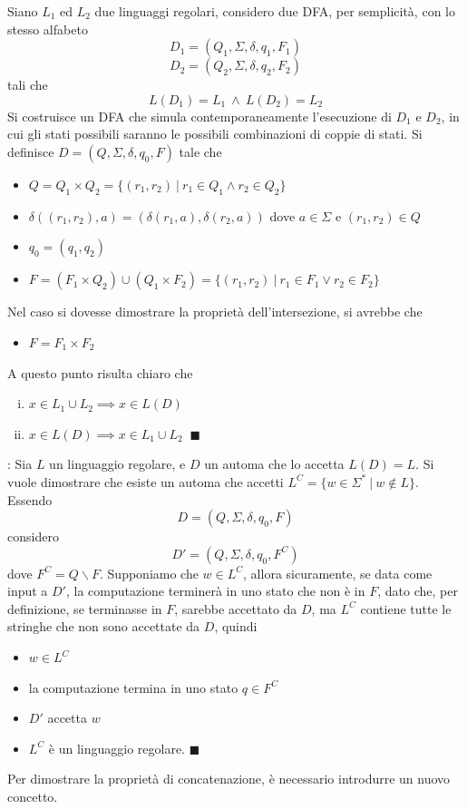 \documentclass[10pt, letterpaper]{report}
\begin{document}
 Siano $L_1$ ed $L_2$ due linguaggi regolari, considero due DFA, per semplicità, con lo stesso alfabeto
$$ 
D_1 = (Q_1,\Sigma,\delta,q_1,F_1)
$$
$$ 
D_2 = (Q_2,\Sigma,\delta,q_2,F_2)
$$
tali che 
$$ L(D_1)=L_1 \ \land \ L(D_2)=L_2$$
Si costruisce un DFA che simula contemporaneamente l'esecuzione di $D_1$ e $D_2$, in cui gli stati possibili saranno 
le possibili combinazioni di coppie di stati. Si definisce $D=(Q,\Sigma,\delta,q_0,F)$ tale che 
\begin{itemize}
    \item $Q=Q_1\times Q_2=\{(r_1,r_2) \ | \ r_1\in Q_1 \land r_2\in Q_2\}$
    \item $\delta((r_1,r_2),a)=(\delta(r_1,a),\delta(r_2,a))$ dove $a\in\Sigma$ e $(r_1,r_2)\in Q$
    \item $q_0=(q_1,q_2)$
    \item $F=(F_1\times Q_2)\cup (Q_1\times F_2)=\{(r_1,r_2)\ | \ r_1\in F_1\lor r_2\in F_2\}$
\end{itemize}
Nel caso si dovesse dimostrare la proprietà dell'intersezione, si avrebbe che \begin{itemize}
    \item $F=F_1\times F_2$
\end{itemize}
A questo punto risulta chiaro che 
\begin{enumerate}[(i)] 
    \item $x\in L_1\cup L_2\implies x\in L(D)$
    \item $x\in L(D)\implies x\in L_1\cup L_2\;\;\blacksquare$ 
\end{enumerate}
 : Sia $L$ un linguaggio regolare, e $D$ un automa che lo accetta $L(D)=L$. Si vuole dimostrare 
che esiste un automa che accetti $L^C = \{w\in \Sigma^* \ |\ w\notin L\}$. Essendo 
$$ D=(Q,\Sigma,\delta,q_0,F)$$
considero 
$$ D'=(Q,\Sigma,\delta,q_0,F^C)$$
dove  $F^C=Q\backslash F$. Supponiamo che $w\in L^C$, allora sicuramente, se data come input a $D'$, 
la computazione terminerà in uno stato che non è in $F$, dato che, per definizione, se terminasse in $F$, sarebbe 
accettato da $D$, ma $L^C$ contiene tutte le stringhe che non sono accettate da $D$, quindi\begin{itemize}
    \item $w\in L^C$
    \item  la computazione termina in uno stato $q\in F^C$ 
    \item $D'$ accetta $w$ 
    \item $L^C$ è un linguaggio regolare. $\blacksquare$ 
\end{itemize} 
Per dimostrare la proprietà di concatenazione, è necessario introdurre un nuovo concetto. 
\flowerLine 
\end{document}
